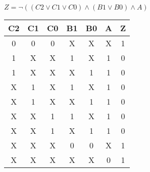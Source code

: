 
\begin{center}
    {\(Z = \lnot ((C2 \lor C1 \lor C0) \land (B1 \lor B0) \land A) \)}
    \begin{table}[h] %
        \begin{center}
            \begin{tabular}{|c|c|c|c|c|c||c|} \hline
            C2 & C1 & C0 & B1 & B0 & A & Z \\ \hline\hline
            0  & 0  & 0  & X  & X  & X & 1 \\ \hline
            1  & X  & X  & 1  & X  & 1 & 0 \\ \hline
            1  & X  & X  & X  & 1  & 1 & 0 \\ \hline
            X  & 1  & X  & 1  & X  & 1 & 0 \\ \hline
            X  & 1  & X  & X  & 1  & 1 & 0 \\ \hline
            X  & X  & 1  & 1  & X  & 1 & 0 \\ \hline
            X  & X  & 1  & X  & 1  & 1 & 0 \\ \hline
            X  & X  & X  & 0  & 0  & X & 1 \\ \hline
            X  & X  & X  & X  & X  & 0 & 1 \\ \hline
            \end{tabular}
        \end{center}
    \end{table}
\end{center}
